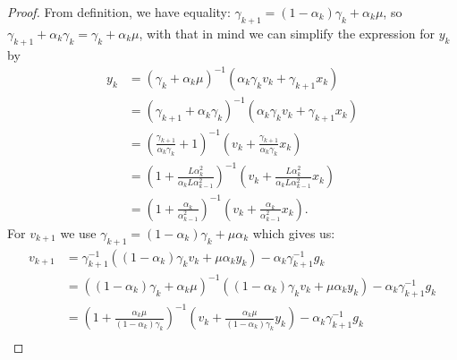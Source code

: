 \documentclass[12pt]{article}
\begin{document}
    \begin{proof}
                
        From definition,  we have equality: $\gamma_{k + 1} = (1 - \alpha_k)\gamma_k + \alpha_k \mu$, so $\gamma_{k + 1} + \alpha_k \gamma_k = \gamma_k + \alpha_k \mu$, with that in mind we can simplify the expression for $y_k$ by 
        \begin{align*}
            y_{k} &= 
            (\gamma_k + \alpha_k \mu)^{-1}
            (\alpha_k \gamma_k v_k + \gamma_{k + 1}x_k)
            \\
            &= 
            (\gamma_{k + 1} + \alpha_k \gamma_k)^{-1}
            (\alpha_k \gamma_k v_k + \gamma_{k + 1}x_k)
            \\
            &= 
            \left(
                \frac{\gamma_{k + 1}}{\alpha_k\gamma_k} + 1
            \right)^{-1}
            \left(
                v_k + \frac{\gamma_{k + 1}}{\alpha_k \gamma_k} x_k
            \right)
            \\
            &= 
            \left(
                1 + \frac{L\alpha_k^2}{\alpha_kL\alpha_{k - 1}^2} 
            \right)^{-1}
            \left(
                v_k + \frac{L\alpha_k^2}{\alpha_k L\alpha_{k - 1}^2} x_k
            \right)
            \\
            &= 
            \left(
                1 + \frac{\alpha_k}{\alpha_{k - 1}^2}
            \right)^{-1}
            \left(
                v_k + 
                \frac{\alpha_k}{\alpha_{k - 1}^2} x_k
            \right). 
        \end{align*}
        For $v_{k + 1}$ we use $\gamma_{k + 1} = (1 - \alpha_k)\gamma_k + \mu \alpha_k$ which gives us: 
        \begin{align*}
            v_{k + 1} &= 
            \gamma_{k + 1}^{-1}
            ((1 - \alpha_k)\gamma_k v_k + \mu\alpha_k y_k)
            - \alpha_k\gamma_{k + 1}^{-1}g_k
            \\
            &= 
            ((1 - \alpha_k)\gamma_k + \alpha_k \mu)^{-1}
            \left(
                (1 - \alpha_k)\gamma_k v_k + \mu\alpha_k y_k
            \right)
            - \alpha_k\gamma_{k + 1}^{-1} g_k
            \\
            &= 
            \left(
                1 + \frac{\alpha_k\mu}{(1 - \alpha_k)\gamma_k}
            \right)^{-1}
            \left(
                v_k + 
                \frac{\alpha_k\mu}{(1 - \alpha_k)\gamma_k} y_k
            \right)
            - \alpha_k\gamma_{k + 1}^{-1} g_k
            \\

\end{align*}
\end{proof}
\end{document}
